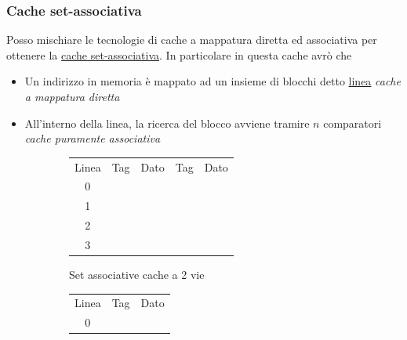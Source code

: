 \subsubsection*{Cache set-associativa}
Posso mischiare le tecnologie di cache a mappatura diretta ed associativa per ottenere la \underline{cache set-associativa}. In particolare in questa cache avrò che
\begin{itemize}
	\item Un indirizzo in memoria è mappato ad un insieme di blocchi detto \underline{linea} \textit{cache a mappatura diretta}
	\item All'interno della linea, la ricerca del blocco avviene tramire $ n $ comparatori \textit{cache puramente associativa}
\end{itemize}
\begin{figure}[H]
	\begin{subfigure}{0.5\textwidth}
		\begin{center}
			\begin{tabular}{ccccc}
				Linea                  & Tag                   & Dato                  & Tag                   & Dato                  \\ \cline{2-5}
				\multicolumn{1}{c|}{0} & \multicolumn{1}{c|}{} & \multicolumn{1}{c|}{} & \multicolumn{1}{c|}{} & \multicolumn{1}{c|}{} \\ \cline{2-5}
				\multicolumn{1}{c|}{1} & \multicolumn{1}{c|}{} & \multicolumn{1}{c|}{} & \multicolumn{1}{c|}{} & \multicolumn{1}{c|}{} \\ \cline{2-5}
				\multicolumn{1}{c|}{2} & \multicolumn{1}{c|}{} & \multicolumn{1}{c|}{} & \multicolumn{1}{c|}{} & \multicolumn{1}{c|}{} \\ \cline{2-5}
				\multicolumn{1}{c|}{3} & \multicolumn{1}{c|}{} & \multicolumn{1}{c|}{} & \multicolumn{1}{c|}{} & \multicolumn{1}{c|}{} \\ \cline{2-5}
			\end{tabular}
		\end{center}
		\caption{Set associative cache a 2 vie}
	\end{subfigure}
	\begin{subfigure}{0.5\textwidth}
		\begin{center}
			\begin{tabular}{ccc}
				Linea                  & Tag                   & Dato                  \\ \cline{2-3}
				\multicolumn{1}{c|}{0} & \multicolumn{1}{c|}{} & \multicolumn{1}{c|}{} \\ \cline{2-3}

\end{tabular}
\end{center}
\end{subfigure}
\end{figure}
